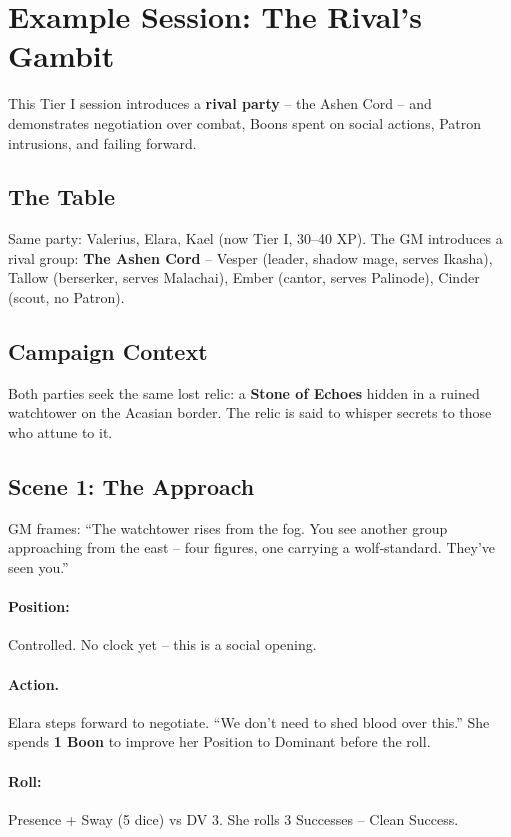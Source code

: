 \section{Example Session: The Rival’s Gambit}

This Tier I session introduces a \textbf{rival party} – the Ashen Cord – and demonstrates negotiation over combat, Boons spent on social actions, Patron intrusions, and failing forward.

\subsection*{The Table}
Same party: Valerius, Elara, Kael (now Tier I, 30–40 XP). The GM introduces a rival group: \textbf{The Ashen Cord} – Vesper (leader, shadow mage, serves Ikasha), Tallow (berserker, serves Malachai), Ember (cantor, serves Palinode), Cinder (scout, no Patron).

\subsection*{Campaign Context}
Both parties seek the same lost relic: a \textbf{Stone of Echoes} hidden in a ruined watchtower on the Acasian border. The relic is said to whisper secrets to those who attune to it.

\subsection*{Scene 1: The Approach}
GM frames: “The watchtower rises from the fog. You see another group approaching from the east – four figures, one carrying a wolf‑standard. They’ve seen you.”

\paragraph{Position:} Controlled. No clock yet – this is a social opening.

\paragraph{Action.} Elara steps forward to negotiate. “We don’t need to shed blood over this.” She spends \textbf{1 Boon} to improve her Position to Dominant before the roll.

\paragraph{Roll:} Presence + Sway (5 dice) vs DV 3. She rolls 3 Successes – Clean Success.

